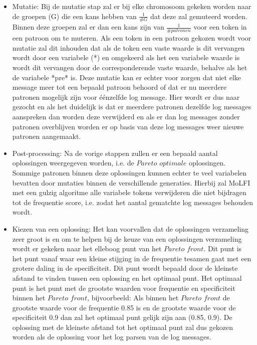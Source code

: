 \begin{itemize}
    \item Mutatie: Bij de mutatie stap zal er bij elke chromosoom gekeken worden naar de groepen (G) die een kans hebben van $\frac{1}{\#G}$ dat deze zal gemuteerd worden. Binnen deze groepen zal er dan een kans zijn van $\frac{1}{\#patronen}$ voor een token in een patroon om te muteren. Als een token in een patroon gekozen wordt voor mutatie zal dit inhouden dat als de token een vaste waarde is dit vervangen wordt door een variabele (*) en omgekeerd als het een variabele waarde is wordt dit vervangen door de corresponderende vaste waarde, behalve als het de variabele *pre* is. Deze mutatie kan er echter voor zorgen dat niet elke message meer tot een bepaald patroon behoord of dat er nu meerdere patronen mogelijk zijn voor éénzelfde log message. Hier wordt er dus naar gezocht en als het duidelijk is dat er meerdere patronen dezelfde log messages aanspreken dan worden deze verwijderd en als er dan log messages zonder patronen overblijven worden er op basis van deze log messages weer nieuwe patronen aangemaakt.\\
    \item Post-processing: Na de vorige stappen zullen er een bepaald aantal oplossingen weergegeven worden, i.e. de $Pareto$ $optimale$ oplossingen. Sommige patronen binnen deze oplossingen kunnen echter te veel variabelen bevatten door mutaties binnen de verschillende generaties. Hierbij zal MoLFI met een gulzig algoritme alle variabele tokens verwijderen die niet bijdragen tot de frequentie score, i.e. zodat het aantal gematchte log messages behouden wordt.\\
    \item Kiezen van een oplossing: Het kan voorvallen dat de oplossingen verzameling zeer groot is en om te helpen bij de keuze van een oplossingen verzameling wordt er gekeken naar het elleboog punt van het $Pareto$ $front$. Dit punt is het punt vanaf waar een kleine stijging in de frequentie tesamen gaat met een grotere daling in de specificiteit. Dit punt wordt bepaald door de kleinste afstand te vinden tussen een oplossing en het optimaal punt. Het optimaal punt is het punt met de grootste waarden voor frequentie en specificiteit binnen het $Pareto$ $front$, bijvoorbeeld: Als binnen het $Pareto$ $front$ de grootste waarde voor de frequentie 0.85 is en de grootste waarde voor de specificiteit 0.9 dan zal het optimaal punt gelijk zijn aan (0.85, 0.9). De oplossing met de kleinste afstand tot het optimaal punt zal dus gekozen worden als de oplossing voor het log parsen van de log messages.
\end{itemize}

